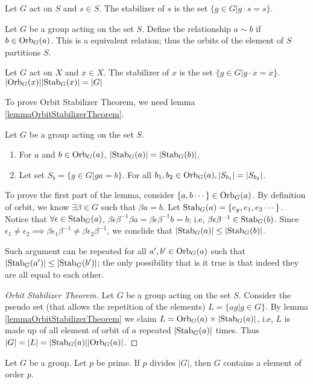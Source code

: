 \documentclass[../note.tex]{subfiles}
\begin{document}
\begin{definition}[Stabilizer]
	Let $G$ act on $S$ and $s \in S$. The stabilizer of $s$ is the set $\{g \in G | g\cdot s = s\}$.
\end{definition}

\begin{theorem}
	Let $G$ be a group acting on the set $S$.
	Define the relationship $a\sim b$ if $b\in \text{Orb}_{G}({a})$.
	This is a equivalent relation; thus the orbits of the element of $S$ partitions $S$.
\end{theorem}

\begin{theorem}
	Let $G$ act on $X$ and $x \in X$. The stabilizer of $x$ is the set $\{g \in G | g\cdot x = x\}$.
	$|\text{Orb}_{G}({x})||\text{Stab}_{G}({x})|=|G|$
\end{theorem}

To prove Orbit Stabilizer Theorem, we need lemma \ref{lemmaOrbitStabilizerTheorem}.

\begin{lemma}\label{lemmaOrbitStabilizerTheorem}
	Let $G$ be a group acting on the set $S$.
\begin{enumerate}
	\item For $a$ and $b\in \text{Orb}_{G}({a})$, $|\text{Stab}_{G}({a})|=|\text{Stab}_{G}({b})|$.
	\item Let set $S_b=\{g\in G| ga=b \}$. For all $b_1, b_2 \in \text{Orb}_{G}({a}), |S_{b_1}|=|S_{b_2}|$.
\end{enumerate}
\end{lemma}

To prove the first part of the lemma, consider $\{a,b \cdots\}\in \text{Orb}_{G}({a})$. By definition of orbit, we know $\exists \beta \in G $ such that $\beta a = b$.
Let $\text{Stab}_{G}({a}) = \{e_g, e_1, e_2 \cdots\}$. Notice that $\forall \epsilon \in \text{Stab}_{G}({a})$, $\beta \epsilon \beta^{-1} \beta a = \beta \epsilon \beta^{-1} b = b$; i.e, $\beta \epsilon \beta^{-1} \in \text{Stab}_{G}({b})$. 
Since $\epsilon_1 \neq \epsilon_2 \implies \beta \epsilon_1 \beta^{-1} \neq \beta \epsilon_2 \beta ^{-1}$, we conclide that $|\text{Stab}_{G}({a})| \leq |\text{Stab}_{G}({b})| $.

Such argument can be repeated for all $a',b' \in \text{Orb}_{G}({a})$ such that $|\text{Stab}_{G}({a'})| \leq |\text{Stab}_{G}({b'})|$; the only possibility that is it true is that indeed they are all equal to each other.

\begin{proof}[Orbit Stabilizer Theorem]
	Let $G$ be a group acting on the set $S$. 
	Consider the pseudo set (that allows the repetition of the elements) $L=\{ag| g\in G\}$. 
	By lemma \ref{lemmaOrbitStabilizerTheorem} we claim $L=\text{Orb}_{G}({a}) \times |\text{Stab}_{G}({a})|$, i.e, $L$ is made up of all element of orbit of $a$ repeated $|\text{Stab}_{G}({a})|$ times. Thus $|G|=|L|=|\text{Stab}_{G}({a})||\text{Orb}_{G}({a})|$.
\end{proof}

\begin{theorem}
	Let $G$ be a group. Let $p$ be prime. If $p$ divides $|G|$, then $G$ contains a element of order $p$.
\end{theorem}
\end{document}
